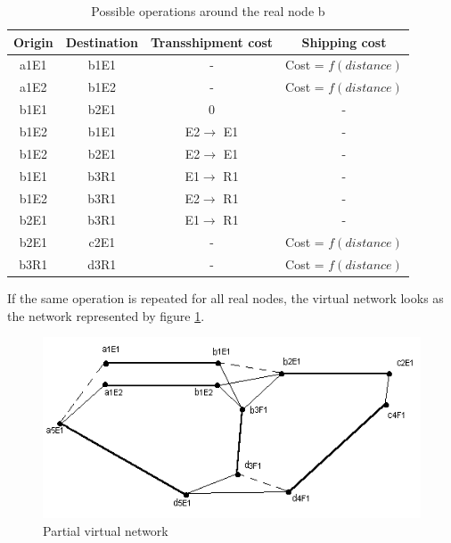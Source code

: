 \begin{table}[htbp]
\begin{center}
\begin{tabular}{cccc}
\hline
Origin & Destination & Transshipment cost & Shipping cost\\
\hline
a1E1 & b1E1 & -                   & Cost = $f(distance)$\\

a1E2 & b1E2 & -                   & Cost = $f(distance)$\\

b1E1 & b2E1 & 0 & -\\ 

b1E2 & b1E1 & E2$ \rightarrow$ E1 & -\\

b1E2 & b2E1 & E2$ \rightarrow$ E1 & -\\

b1E1 & b3R1 & E1$ \rightarrow$ R1 & -\\ 

b1E2 & b3R1 & E2$ \rightarrow$ R1 & -

\\b2E1 & b3R1 & E1$ \rightarrow$ R1 & -\\ 

b2E1 & c2E1 & - & Cost = $f(distance)$\\

b3R1 & d3R1 & -                   & Cost = $f(distance)$\\
\hline
\end{tabular}
\caption{\label{tab3_4} Possible operations around the real node b}
\end{center}
\end{table}


If the same operation is repeated for all real nodes, the virtual network looks as the network represented by figure \ref{f3_6}.


\begin{figure}[htbp]
\centerline{\includegraphics[width=12cm]{f3_6.png}}
\caption{\label{f3_6} Partial virtual network}
\end{figure}

